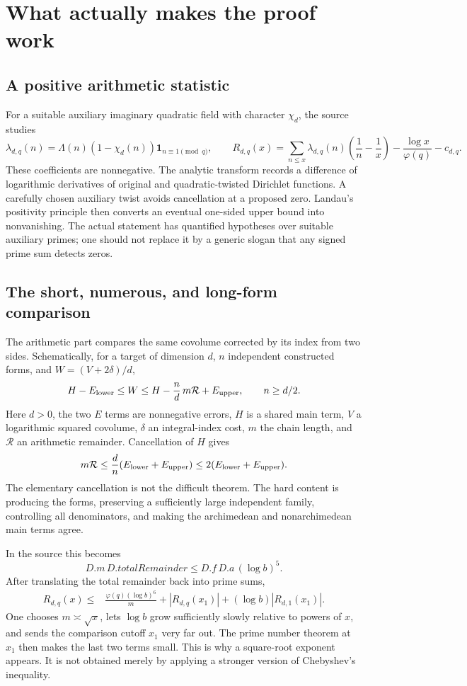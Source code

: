 \documentclass[11pt,letterpaper]{article}
\theoremstyle{definition}
\theoremstyle{remark}
\begin{document}
\section{What actually makes the proof work}

\subsection{A positive arithmetic statistic}

For a suitable auxiliary imaginary quadratic field with character
$\chi_d$, the source studies
\[
 \lambda_{d,q}(n)=\Lambda(n)(1-\chi_d(n))\mathbf 1_{n\equiv1\pmod q},
 \qquad
 R_{d,q}(x)=\sum_{n\le x}\lambda_{d,q}(n)
       \left(\frac1n-\frac1x\right)-\frac{\log x}{\varphi(q)}-c_{d,q}.
\]
These coefficients are nonnegative. The analytic transform records a
difference of logarithmic derivatives of original and quadratic-twisted
Dirichlet functions. A carefully chosen auxiliary twist avoids
cancellation at a proposed zero. Landau's positivity principle then
converts an eventual one-sided upper bound into nonvanishing.
The actual statement has quantified hypotheses over suitable auxiliary
primes; one should not replace it by a generic slogan that any signed
prime sum detects zeros.\cite{criterion,prime-sums}

\subsection{The short, numerous, and long-form comparison}

The arithmetic part compares the same covolume corrected by its index
from two sides. Schematically, for a target of dimension $d$, $n$
independent constructed forms, and $W=(V+2\delta)/d$,
\[
 H-E_{\rm lower}\le W
 \le H-\frac nd\,m\mathcal R+E_{\rm upper},
 \qquad n\ge d/2.
\]
Here $d>0$, the two $E$ terms are nonnegative errors,
$H$ is a shared main term, $V$ a logarithmic squared covolume,
$\delta$ an integral-index cost, $m$ the chain length, and
$\mathcal R$ an arithmetic remainder. Cancellation of $H$ gives
\[
 m\mathcal R\le\frac dn(E_{\rm lower}+E_{\rm upper})
       \le2(E_{\rm lower}+E_{\rm upper}).
\]
The elementary cancellation is not the difficult theorem. The hard
content is producing the forms, preserving a sufficiently large
independent family, controlling all denominators, and making the
archimedean and nonarchimedean main terms agree.

In the source this becomes
\[
 D.m\,D.totalRemainder\le D.f\,D.a\,(\log b)^5.
\]
After translating the total remainder back into prime sums,
\begin{align*}
 R_{d,q}(x)\le {}&\frac{\varphi(q)(\log b)^6}{m}
       +|R_{d,q}(x_1)|+(\log b)|R_{d,1}(x_1)|.
\end{align*}
One chooses $m\asymp\sqrt x$, lets $\log b$ grow sufficiently slowly
relative to powers of $x$, and sends the comparison cutoff $x_1$ very
far out. The prime number theorem at $x_1$ then makes the last two terms
small. This is why a square-root exponent appears. It is not obtained
merely by applying a stronger version of Chebyshev's inequality.
\cite{main-inequality,one-sided}
\end{document}
